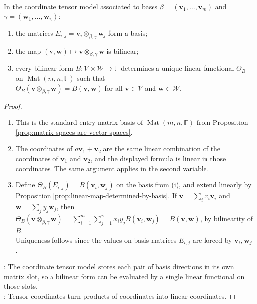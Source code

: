 \begin{proposition} \label{prop:tensor-product-matrix-basis-model} \\
In the coordinate tensor model associated to bases $\beta=(\mathbf{v}_1,\ldots,\mathbf{v}_m)$ and $\gamma=(\mathbf{w}_1,\ldots,\mathbf{w}_n)$:
\begin{enumerate}[label=(\roman*)]
\setlength{\itemsep}{0pt}
\item the matrices $E_{i,j}=\mathbf{v}_i\otimes_{\beta,\gamma}\mathbf{w}_j$ form a basis;
\item the map $(\mathbf{v},\mathbf{w})\mapsto\mathbf{v}\otimes_{\beta,\gamma}\mathbf{w}$ is bilinear;
\item every bilinear form $B:\mathcal{V}\times\mathcal{W}\to\mathbb{F}$ determines a unique linear functional $\Theta_B$ on $\operatorname{Mat}(m,n,\mathbb{F})$ such that\\
$\Theta_B(\mathbf{v}\otimes_{\beta,\gamma}\mathbf{w})=B(\mathbf{v},\mathbf{w})$ for all $\mathbf{v}\in\mathcal{V}$ and $\mathbf{w}\in\mathcal{W}$.
\end{enumerate}
\begin{proof}
\begin{enumerate}[label=(\roman*)]
\setlength{\itemsep}{0pt}
\item This is the standard entry-matrix basis of $\operatorname{Mat}(m,n,\mathbb{F})$ from Proposition \ref{prop:matrix-spaces-are-vector-spaces}.
\item The coordinates of $a\mathbf{v}_1+\mathbf{v}_2$ are the same linear combination of the coordinates of $\mathbf{v}_1$ and $\mathbf{v}_2$, and the displayed formula is linear in those coordinates. The same argument applies in the second variable.
\item Define $\Theta_B(E_{i,j})=B(\mathbf{v}_i,\mathbf{w}_j)$ on the basis from (i), and extend linearly by Proposition \ref{prop:linear-map-determined-by-basis}. If $\mathbf{v}=\sum_i x_i\mathbf{v}_i$ and $\mathbf{w}=\sum_j y_j\mathbf{w}_j$, then $\Theta_B(\mathbf{v}\otimes_{\beta,\gamma}\mathbf{w}) =\sum\limits_{i=1}^m\sum\limits_{j=1}^n x_i y_j B(\mathbf{v}_i,\mathbf{w}_j) =B(\mathbf{v},\mathbf{w})$, by bilinearity of $B$.\\
Uniqueness follows since the values on basis matrices $E_{i,j}$ are forced by $\mathbf{v}_i,\mathbf{w}_j$.
\end{enumerate}
: The coordinate tensor model stores each pair of basis directions in its own matrix slot, so a bilinear form can be evaluated by a single linear functional on those slots.\\
: Tensor coordinates turn products of coordinates into linear coordinates.
\end{proof}
\end{proposition}

